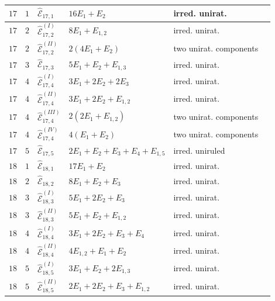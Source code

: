 \documentclass[11pt]{amsart}
\theoremstyle{definition}
\def\E{{\mathcal E}}
\begin{document}
\begin{minipage}[t]{\textwidth/2-1mm}
\begin{flushright}
{\begin{tabular}{ |l | l |l|l|l|l|}
$17$ & $1$ & $\widehat{\E}_{17,1}$ & $16E_1+E_2$ & irred. unirat. \\\hline
$17$ & $2$ & $\widehat{\E}_{17,2}^{(I)}$ & $8E_1+E_{1,2}$ & irred. unirat.\\
$17$ & $2$ & $\widehat{\E}_{17,2}^{(II)}$ & $2(4E_1+E_{2})$  & two  unirat. components \\\hline
$17$ & $3$ & $\widehat{\E}_{17,3}$ & $5E_1+E_2+E_{1,3}$ & irred. unirat. \\\hline
$17$ & $4$ & $\widehat{\E}_{17,4}^{(I)}$ & $3E_1+2E_2+2E_3$ & irred. unirat.\\
$17$ & $4$ & $\widehat{\E}_{17,4}^{(II)}$ & $3E_1+2E_2+E_{1,2}$  & irred. unirat.\\
$17$ & $4$ & $\widehat{\E}_{17,4}^{(III)}$ & $2(2E_1+E_{1,2})$ & two  unirat. components \\
$17$ & $4$ & $\widehat{\E}_{17,4}^{(IV)}$ &  $4(E_1+E_2)$ & two  unirat. components \\\hline
$17$ & $5$ & $\widehat{\E}_{17,5}$ & $2E_1+E_2+E_3+E_4+E_{1,5}$ & irred. uniruled  \\\hline\hline

$18$ & $1$ & $\widehat{\E}_{18,1}$ & $17E_1+E_2$ & irred. unirat. \\\hline
$18$ & $2$ & $\widehat{\E}_{18,2}$ & $8E_1+E_2+E_3$ &
irred. unirat. \\\hline 
$18$ & $3$ & $\widehat{\E}_{18,3}^{(I)}$ & $5E_1+2E_2+E_3$ &
irred. unirat.\\ 
$18$ & $3$ & $\widehat{\E}_{18,3}^{(II)}$ & $5E_1+E_2+E_{1,2}$  & irred. unirat.\\\hline 
$18$ & $4$ & $\widehat{\E}_{18,4}^{(I)}$ & $3E_1+2E_2+E_3+E_4$ & irred. unirat.\\
$18$ & $4$ & $\widehat{\E}_{18,4}^{(II)}$ & $4E_{1,2}+E_1+E_2$  & irred. unirat.\\\hline 
$18$ & $5$ & $\widehat{\E}_{18,5}^{(I)}$ & $3E_1+E_2+2E_{1,3}$ & irred. unirat.\\
$18$ & $5$ & $\widehat{\E}_{18,5}^{(II)}$ & $2E_1+2E_2+E_3+E_{1,2}$  & irred. unirat.\\\hline\hline 


\end{tabular}}
\end{flushright}
\end{minipage}
\end{document}
